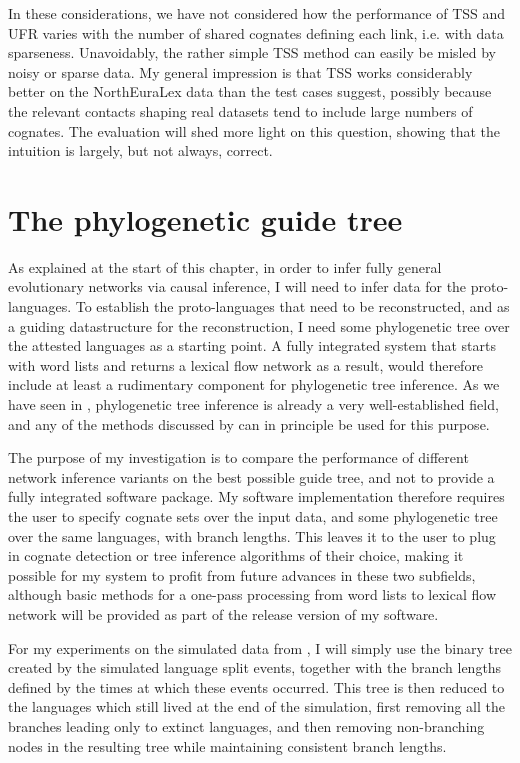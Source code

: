 In these considerations, we have not considered how the performance of TSS and UFR varies with the number of shared cognates defining each link, i.e. with data sparseness. Unavoidably, the rather simple TSS method can easily be misled by noisy or sparse data. My general impression is that TSS works considerably better on the NorthEuraLex data than the test cases suggest, possibly because the relevant contacts shaping real datasets tend to include large numbers of cognates. The evaluation will shed more light on this question, showing that the intuition is largely, but not always, correct.

\section{The phylogenetic guide tree}\label{sec:6.6}
As explained at the start of this chapter, in order to infer fully general evolutionary networks via causal inference, I will need to infer data for the proto-languages. To establish the proto-languages that need to be reconstructed, and as a guiding datastructure for the reconstruction, I need some phylogenetic tree over the attested languages as a starting point. A fully integrated system that starts with word lists and returns a lexical flow network as a result, would therefore include at least a rudimentary component for phylogenetic tree inference. As we have seen in , phylogenetic tree inference is already a very well-established field, and any of the methods discussed by \cite{felsenstein2004} can in principle be used for this purpose.

The purpose of my investigation is to compare the performance of different network inference variants on the best possible guide tree, and not to provide a fully integrated software package. My software implementation therefore requires the user to specify cognate sets over the input data, and some phylogenetic tree over the same languages, with branch lengths. This leaves it to the user to plug in cognate detection or tree inference algorithms of their choice, making it possible for my system to profit from future advances in these two subfields, although basic methods for a one-pass processing from word lists to lexical flow network will be provided as part of the release version of my software.

For my experiments on the simulated data from , I will simply use the binary tree created by the simulated language split events, together with the branch lengths defined by the times at which these events occurred. This tree is then reduced to the languages which still lived at the end of the simulation, first removing all the branches leading only to extinct languages, and then removing non-branching nodes in the resulting tree while maintaining consistent branch lengths.

